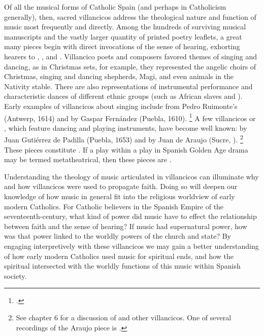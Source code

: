 Of all the musical forms of Catholic Spain (and perhaps in Catholicism generally), then, sacred villancicos address the theological nature and function of music most frequently and directly.
Among the hundreds of surviving musical manuscripts and the vastly larger quantity of printed poetry leaflets, a great many pieces begin with direct invocations of the sense of hearing, exhorting hearers to  ,  , and  .
Villancico poets and composers favored themes of singing and dancing, as in Christmas sets, for example, they represented the angelic choirs of Christmas, singing and dancing shepherds, Magi, and even animals in the Nativity stable.
There are also representations of instrumental performance and characteristic dances of different ethnic groups (such as African slaves and ).
Early examples of villancicos about singing include  from Pedro Ruimonte's  (Antwerp, 1614) and  by Gaspar Fernández (Puebla, 1610).%
	\footnote{%
	\label{fn:Ruimonte}
	\autocites[296--309]{Ruimonte:Parnaso}[240--244]{Fernandes:Cancionero}.
	}
A few  villancicos or , which feature dancing and playing instruments, have become well known:  by Juan Gutiérrez de Padilla (Puebla, 1653) and  by Juan de Araujo (Sucre, ).%
	\footnote{%
	See chapter 6 for a discussion of  and other  villancicos.
	One of several recordings of the Araujo piece is \autocite{Skidmore:NewWorldCD}.
	}
These pieces constitute .
If a play within a play in Spanish Golden Age drama may be termed metatheatrical, then these pieces are .

Understanding the theology of music articulated in villancicos can illuminate why and how villancicos were used to propagate faith.
Doing so will deepen our knowledge of how music in general fit into the religious worldview of early modern Catholics. 
For Catholic believers in the Spanish Empire of the seventeenth-century, what kind of power did music have to effect the relationship between faith and the sense of hearing?
If music had supernatural power, how was that power linked to the worldly powers of the church and state?
By engaging interpretively with these villancicos we may gain a better understanding of how early modern Catholics used music for spiritual ends, and how the spiritual intersected with the worldly functions of this music within Spanish society. 

